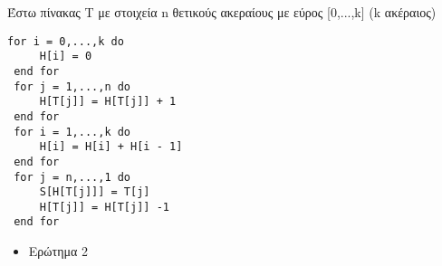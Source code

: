 \documentclass[a4paper]{article}
\begin{document}
\lstset{frame=none}
\begin{tcolorbox}[colback=blue!20!white,colframe=purple!60!white,title=\textbf{Algorithm 1}]
Έστω πίνακας T με στοιχεία n θετικούς ακεραίους με εύρος [0,...,k] (k ακέραιος)
\begin{lstlisting}[mathescape]
 for i = 0,...,k do
	 H[i] = 0
 end for
 for j = 1,...,n do
	 H[T[j]] = H[T[j]] + 1
 end for
 for i = 1,...,k do
	 H[i] = H[i] + H[i - 1]
 end for
 for j = n,...,1 do
	 S[H[T[j]]] = T[j]
	 H[T[j]] = H[T[j]] -1
 end for
\end{lstlisting}
\end{tcolorbox}



\begin{itemize}
\item Ερώτημα 2
\end{itemize}
\end{document}
